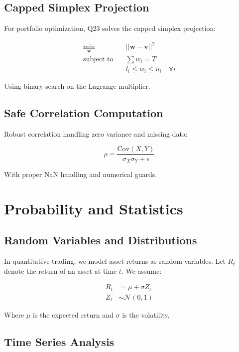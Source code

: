 \documentclass[11pt,letterpaper]{book}
\newcommand{\Cov}{\mathrm{Cov}}
\begin{document}
\subsection{Capped Simplex Projection}

For portfolio optimization, Q23 solves the capped simplex projection:

\begin{align}
\min_{\mathbf{w}} \quad & ||\mathbf{w} - \mathbf{v}||^2 \\
\text{subject to} \quad & \sum w_i = T \\
& l_i \leq w_i \leq u_i \quad \forall i
\end{align}

Using binary search on the Lagrange multiplier.

\subsection{Safe Correlation Computation}

Robust correlation handling zero variance and missing data:

\begin{equation}
\rho = \frac{\Cov(X,Y)}{\sigma_X \sigma_Y + \epsilon}
\end{equation}

With proper NaN handling and numerical guards.

\section{Probability and Statistics}

\subsection{Random Variables and Distributions}

In quantitative trading, we model asset returns as random variables. Let $R_t$ denote the return of an asset at time $t$. We assume:

\begin{align}
R_t &= \mu + \sigma Z_t \\
Z_t &\sim \mathcal{N}(0,1)
\end{align}

Where $\mu$ is the expected return and $\sigma$ is the volatility.

\subsection{Time Series Analysis}
\end{document}
